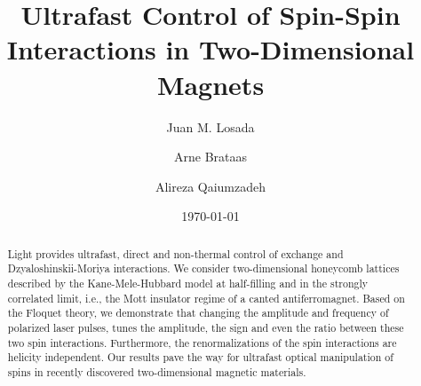 \documentclass[aps,prl,twocolumn,amsmath,amssymb,nobibnotes]{revtex4-1}%
\begin{document}
\title{Ultrafast Control of Spin-Spin Interactions in Two-Dimensional Magnets}

\author{Juan M. Losada}
\author{Arne Brataas}
\author{Alireza Qaiumzadeh}

\begin{abstract}
Light provides ultrafast, direct and non-thermal control of exchange and Dzyaloshinskii-Moriya interactions. We consider two-dimensional honeycomb lattices described by the Kane-Mele-Hubbard model at half-filling and in the strongly correlated limit, i.e., the Mott insulator regime of a canted antiferromagnet. Based on the Floquet theory, we demonstrate that changing the amplitude and frequency of polarized laser pulses, tunes the amplitude, the sign and even the ratio between these two spin interactions. Furthermore, the renormalizations of the spin interactions are helicity independent. Our results pave the way for ultrafast optical manipulation of spins in recently discovered two-dimensional magnetic materials.
\end{abstract}

\date{\today}
\maketitle
\end{document}
